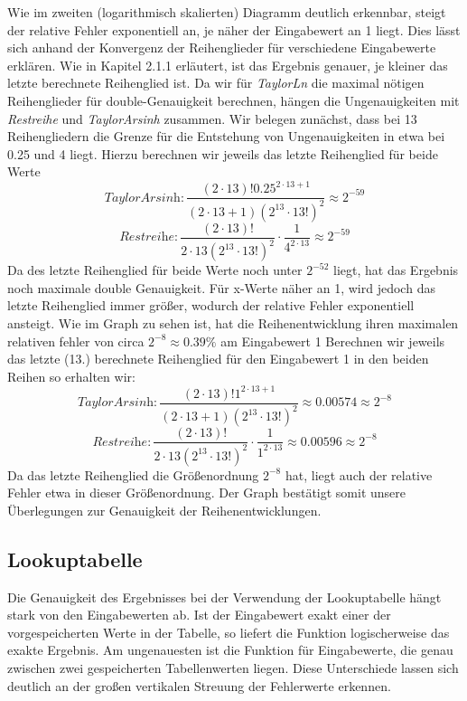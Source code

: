 \documentclass[course=erap] {aspdoc}
\begin{document}
    Wie im zweiten (logarithmisch skalierten) Diagramm deutlich erkennbar, steigt der relative Fehler exponentiell an, je näher der Eingabewert an 1 liegt. Dies lässt sich  anhand der Konvergenz der Reihenglieder für verschiedene Eingabewerte erklären. Wie in Kapitel 2.1.1 erläutert, ist das Ergebnis genauer, je kleiner das letzte berechnete Reihenglied ist. Da wir für \textit{TaylorLn} die maximal nötigen Reihenglieder für double-Genauigkeit berechnen, hängen die Ungenauigkeiten mit \textit{Restreihe} und \textit{TaylorArsinh} zusammen. 
    Wir belegen zunächst, dass bei 13 Reihengliedern die Grenze für die Entstehung von Ungenauigkeiten in etwa bei 0.25 und 4 liegt. Hierzu berechnen wir jeweils das letzte Reihenglied für beide Werte 
    \[
    \textit{TaylorArsinh}: \frac{(2\cdot13)!0.25^{2\cdot13 + 1}}{(2\cdot13 + 1)(2^13\cdot13!)^2} \approx 2^{-59}
    \]
    \[
    \textit{Restreihe}: \frac{(2\cdot13)!}{2\cdot13(2^{13}\cdot 13!)^2} \cdot \frac{1}{4^{2\cdot13}} \approx 2^{-59}
    \]
    Da des letzte Reihenglied für beide Werte noch unter $2^{-52}$ liegt, hat das Ergebnis noch maximale double Genauigkeit. Für x-Werte näher an 1, wird jedoch das letzte Reihenglied immer größer, wodurch der relative Fehler exponentiell ansteigt. Wie im Graph zu sehen ist, hat die Reihenentwicklung ihren maximalen relativen fehler von circa $2^{-8} \approx 0.39\%$ am Eingabewert 1
    Berechnen wir jeweils das letzte (13.) berechnete Reihenglied für den Eingabewert 1 in den beiden Reihen so erhalten wir:
    \[
    \textit{TaylorArsinh}: \frac{(2\cdot13)!1^{2\cdot13 + 1}}{(2\cdot13 + 1)(2^13\cdot13!)^2} \approx 0.00574 \approx 2^{-8}
    \]
    \[
    \textit{Restreihe}: \frac{(2\cdot13)!}{2\cdot13(2^{13}\cdot 13!)^2} \cdot \frac{1}{1^{2\cdot13}} \approx 0.00596 \approx 2^{-8}
    \]
    Da das letzte Reihenglied die Größenordnung $2^{-8}$ hat, liegt auch der relative Fehler etwa in dieser Größenordnung. Der Graph bestätigt somit unsere Überlegungen zur Genauigkeit der Reihenentwicklungen. 
    
    
    \subsection{Lookuptabelle}
    Die Genauigkeit des Ergebnisses bei der Verwendung der Lookuptabelle hängt stark von den Eingabewerten ab. Ist der Eingabewert exakt einer der vorgespeicherten Werte in der Tabelle, so liefert die Funktion logischerweise das exakte Ergebnis. Am ungenauesten ist die Funktion für Eingabewerte, die genau zwischen zwei gespeicherten Tabellenwerten liegen. Diese Unterschiede lassen sich deutlich an der großen vertikalen Streuung der Fehlerwerte erkennen.
    
\end{document}

